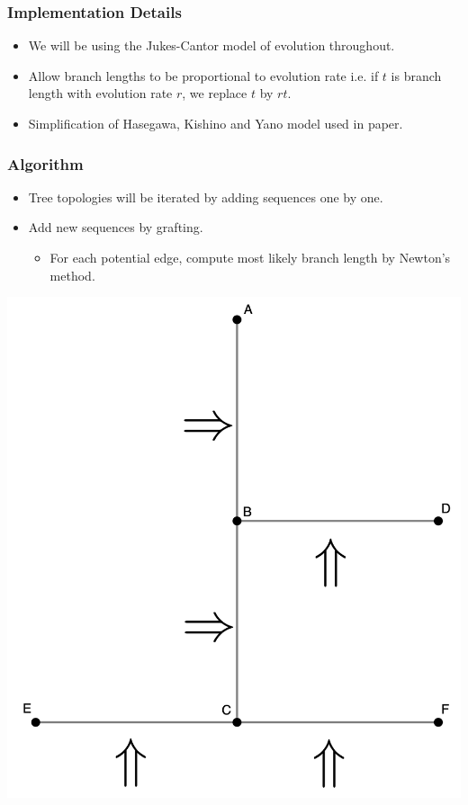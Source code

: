 \documentclass{beamer}
\begin{document}
\begin{frame}
    \frametitle{Implementation Details}
    \begin{itemize}
    \item We will be using the Jukes-Cantor model of evolution throughout.
    \item Allow branch lengths to be proportional to evolution rate i.e. if $t$ is branch length with evolution rate $r$, we replace $t$ by $rt$.
    \item Simplification of Hasegawa, Kishino and Yano model used in paper.
    \end{itemize}
\end{frame}

\begin{frame}
    \frametitle{Algorithm}
    \begin{itemize}
    \item Tree topologies will be iterated by adding sequences one by one.
    \item Add new sequences by grafting.
        \begin{itemize}
            \item For each potential edge, compute most likely branch length by Newton's method.
        \end{itemize}
    \end{itemize}
    \begin{center}
        \includegraphics[scale=0.2]{graft.png}
    \end{center}
\end{frame}
\end{document}
